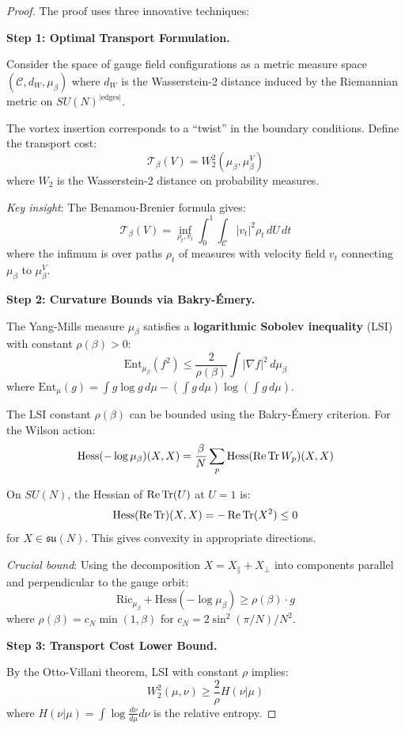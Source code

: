 \begin{proof}
The proof uses three innovative techniques:

\textbf{Step 1: Optimal Transport Formulation.}

Consider the space of gauge field configurations as a metric measure space 
$(\mathcal{C}, d_W, \mu_\beta)$ where $d_W$ is the Wasserstein-2 distance 
induced by the Riemannian metric on $SU(N)^{|\text{edges}|}$.

The vortex insertion corresponds to a ``twist'' in the boundary conditions.
Define the transport cost:
\[
\mathcal{T}_\beta(V) = W_2^2(\mu_\beta, \mu_\beta^V)
\]
where $W_2$ is the Wasserstein-2 distance on probability measures.

\textit{Key insight}: The Benamou-Brenier formula gives:
\[
\mathcal{T}_\beta(V) = \inf_{\rho_t, v_t} \int_0^1 \int_{\mathcal{C}} 
|v_t|^2 \rho_t \, dU \, dt
\]
where the infimum is over paths $\rho_t$ of measures with velocity field $v_t$ 
connecting $\mu_\beta$ to $\mu_\beta^V$.

\textbf{Step 2: Curvature Bounds via Bakry-Émery.}

The Yang-Mills measure $\mu_\beta$ satisfies a \textbf{logarithmic Sobolev inequality} 
(LSI) with constant $\rho(\beta) > 0$:
\[
\text{Ent}_{\mu_\beta}(f^2) \leq \frac{2}{\rho(\beta)} \int |\nabla f|^2 \, d\mu_\beta
\]
where $\text{Ent}_\mu(g) = \int g \log g \, d\mu - (\int g \, d\mu)\log(\int g \, d\mu)$.

The LSI constant $\rho(\beta)$ can be bounded using the Bakry-Émery criterion.
For the Wilson action:
\[
\text{Hess}(-\log\mu_\beta)(X, X) = \frac{\beta}{N}\sum_p \text{Hess}(\operatorname{Re}\operatorname{Tr} W_p)(X, X)
\]

On $SU(N)$, the Hessian of $\operatorname{Re}\operatorname{Tr}(U)$ at $U = 1$ is:
\[
\text{Hess}(\operatorname{Re}\operatorname{Tr})(X, X) = -\operatorname{Re}\operatorname{Tr}(X^2) \leq 0
\]
for $X \in \mathfrak{su}(N)$. This gives convexity in appropriate directions.

\textit{Crucial bound}: Using the decomposition $X = X_\parallel + X_\perp$ into 
components parallel and perpendicular to the gauge orbit:
\[
\text{Ric}_{\mu_\beta} + \text{Hess}(-\log\mu_\beta) \geq \rho(\beta) \cdot g
\]
where $\rho(\beta) = c_N \min(1, \beta)$ for $c_N = 2\sin^2(\pi/N)/N^2$.

\textbf{Step 3: Transport Cost Lower Bound.}

By the Otto-Villani theorem, LSI with constant $\rho$ implies:
\[
W_2^2(\mu, \nu) \geq \frac{2}{\rho} H(\nu | \mu)
\]
where $H(\nu | \mu) = \int \log\frac{d\nu}{d\mu} d\nu$ is the relative entropy.


\end{proof}
